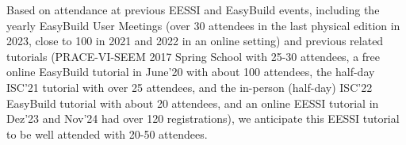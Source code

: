 Based on attendance at previous EESSI and EasyBuild events, including the yearly EasyBuild User Meetings (over 30
attendees in the last physical edition in 2023, close to 100 in 2021 and 2022 in an online setting) and previous
related tutorials (PRACE-VI-SEEM 2017 Spring School with 25-30 attendees, a free online EasyBuild tutorial in June'20
with about 100 attendees, the half-day ISC'21 tutorial with over 25 attendees, and the in-person (half-day) ISC'22
EasyBuild tutorial with about 20 attendees, and an online EESSI tutorial in Dez'23 and Nov'24 had over 120 registrations), we
anticipate this EESSI tutorial to be well attended with 20-50 attendees.



